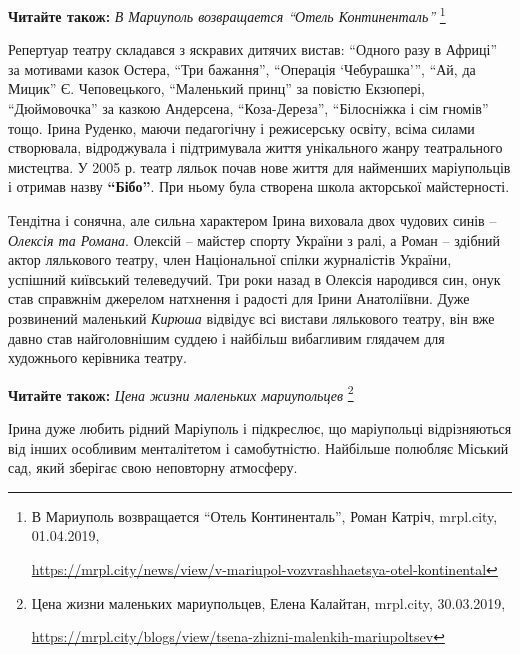 \textbf{Читайте також:} \emph{В Мариуполь возвращается \enquote{Отель Континенталь}}%
\footnote{В Мариуполь возвращается \enquote{Отель Континенталь}, Роман Катріч, mrpl.city, 01.04.2019, \par%
\url{https://mrpl.city/news/view/v-mariupol-vozvrashhaetsya-otel-kontinental}%
}

Репертуар театру складався з яскравих дитячих вистав: \enquote{Одного разу в
Африці} за мотивами казок Остера, \enquote{Три бажання}, \enquote{Операція
\enquote{Чебурашка}}, \enquote{Ай, да Мицик} Є.  Чеповецького,
\enquote{Маленький принц} за повістю Екзюпері, \enquote{Дюймовочка} за казкою
Андерсена, \enquote{Коза-Дереза}, \enquote{Білосніжка і сім гномів} тощо. Ірина
Руденко, маючи педагогічну і режисерську освіту, всіма силами створювала,
відроджувала і підтримувала життя унікального жанру театрального мистецтва. У
2005 р. театр ляльок почав нове життя для найменших маріупольців і отримав
назву \textbf{\enquote{Бібо}}. При ньому була створена школа акторської
майстерності.


Тендітна і сонячна, але сильна характером Ірина виховала двох чудових синів –
\emph{Олексія та Романа}. Олексій – майстер спорту України з ралі, а Роман –
здібний актор лялькового театру, член Національної спілки журналістів України,
успішний київський телеведучий. Три роки назад в Олексія народився син, онук
став справжнім джерелом натхнення і радості для Ірини Анатоліївни. Дуже
розвинений маленький \emph{Кирюша} відвідує всі вистави лялькового театру, він вже
давно став найголовнішим суддею і найбільш вибагливим глядачем для художнього
керівника театру.


\textbf{Читайте також:} \emph{Цена жизни маленьких мариупольцев}%
\footnote{Цена жизни маленьких мариупольцев, Елена Калайтан, mrpl.city, 30.03.2019, \par%
\url{https://mrpl.city/blogs/view/tsena-zhizni-malenkih-mariupoltsev} }

Ірина дуже любить рідний Маріуполь і підкреслює, що маріупольці відрізняються
від інших особливим менталітетом і самобутністю. Найбільше полюбляє Міський
сад, який зберігає свою неповторну атмосферу.


